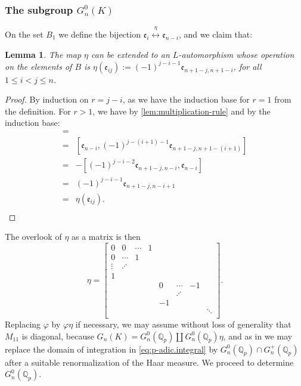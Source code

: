 \documentclass{article}
\newtheorem{lemma}[theorem]{Lemma}
\newcommand{\e}{\mathfrak{e}}
\begin{document}
\subsubsection{The subgroup $G_n^0(K)$}
On the set $B_1$ we define the bijection $\e_i\overset{\eta}{\longleftrightarrow}\e_{n-i}$, and we claim that: 
\begin{lemma}
The map $\eta$ can be extended to an ${L}$-automorphism whose operation on the elements of $B$ is $\eta(\e_{ij}):=(-1)^{j-i-1}\e_{n+1-j,n+1-i}$, for all $1\leq{i}<j\leq{n}$.
\end{lemma}
\begin{proof}
By induction on $r=j-i$, as we have the induction base for $r=1$ from the definition.
For $r>1$, we have by \ref{lem:multiplication-rule} and by the induction base:
\begin{align*}
[\eta(\e_i),\eta(\e_{i+1,j})]=\\
=&[\e_{n-i},(-1)^{j-(i+1)-1}\e_{n+1-j,n+1-(i+1)}]\\
=&-[(-1)^{j-i-2}\e_{n+1-j,n-i},\e_{n-i}]\\
=&(-1)^{j-i-1}\e_{n+1-j,n-i+1}\\
=&\eta(\e_{ij}).\\
\end{align*}
\end{proof}
The overlook of $\eta$ as a matrix is then
\[
\eta=\begin{bmatrix}
0&0&\cdots&1\\
0&\cdots&1\\
\vdots&\iddots\\
1\\
&&&&0&\cdots&-1\\
&&&&&\iddots\\
&&&&-1\\
&&&&&&&\ddots\\
\end{bmatrix}.
\]
Replacing $\varphi$ by $\varphi\eta$ if necessary, we may assume without loss of generality that $M_{11}$ is diagonal, because
$G_{n}(K)=G_{n}^{0}(\mathbb{Q}_{p})\coprod{G_{n}^{0}(\mathbb{Q}_{p})}\eta$, and as in \cite[Proposition 2.1]{DuSautoyLubotzky} we may replace the domain of integration in \eqref{eq:p-adic.integral} by $G_{n}^{0}(\mathbb{Q}_{p})\cap{G_{n}^{+}(\mathbb{Q}_{p})}$ after a suitable renormalization of the Haar measure. We proceed to determine $G_{n}^{0}(\mathbb{Q}_{p})$.
\end{document}
